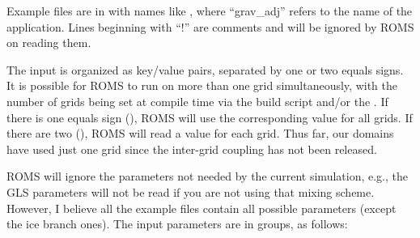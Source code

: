 Example files are in  with names like
, where ``grav\_adj'' refers to the name of
the application. Lines beginning with ``!'' are comments and will be
ignored by ROMS on reading them.

The input is organized as key/value pairs, separated by one or two
equals signs. It is possible for ROMS to run on more than one grid
simultaneously, with the number of grids being set at compile time
via the build script and/or the . If there is one
equals sign (\code{=}), ROMS will use the corresponding value for
all grids. If there are two (\code{==}), ROMS will read a value for
each grid. Thus far, our domains have used just one grid since the
inter-grid coupling has not been released.

ROMS will ignore the parameters not needed by the current
simulation, e.g., the GLS parameters will not be read if you are not
using that mixing scheme. However, I believe all the example files
contain all possible parameters (except the ice branch ones).
The input parameters are in groups, as follows:
